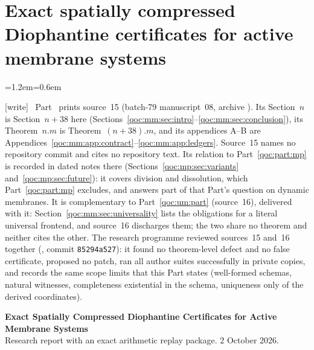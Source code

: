 \documentclass[11pt,letterpaper]{article}
\theoremstyle{definition}
\theoremstyle{remark}
\newcommand{\wtag}{\textup{[write]}}
\newenvironment{writenote}{\par\smallskip\begin{list}{}{\leftmargin=1.2em\rightmargin=0.6em}\item[]\small\wtag\ }{\end{list}\smallskip}
\begin{document}
\clearpage
\part{Exact spatially compressed Diophantine certificates for active membrane systems}\label{qoc:mm:part}

\begin{writenote}
Part~\ref{qoc:mm:part} prints source~15 (batch-79 manuscript~08, archive ). Its Section~$n$ is Section~$n+38$ here (Sections~\ref{qoc:mm:sec:intro}--\ref{qoc:mm:sec:conclusion}), its Theorem~$n.m$ is Theorem~$(n+38).m$, and its appendices A--B are Appendices~\ref{qoc:mm:app:contract}--\ref{qoc:mm:app:ledgers}. Source~15 names no repository commit and cites no repository text. Its relation to Part~\ref{qoc:part:mp} is recorded in dated notes there (Sections~\ref{qoc:mp:sec:variants} and~\ref{qoc:mp:sec:future}): it covers division and dissolution, which Part~\ref{qoc:part:mp} excludes, and answers part of that Part's question on dynamic membranes. It is complementary to Part~\ref{qoc:um:part} (source~16), delivered with it: Section~\ref{qoc:mm:sec:universality} lists the obligations for a literal universal frontend, and source~16 discharges them; the two share no theorem and neither cites the other. The research programme reviewed sources~15 and~16 together (, commit \texttt{85294a527}): it found no theorem-level defect and no false certificate, proposed no patch, ran all author suites successfully in private copies, and records the same scope limits that this Part states (well-formed schemas, natural witnesses, completeness existential in the schema, uniqueness only of the derived coordinates).
\end{writenote}

\begin{center}
{\large\bfseries Exact Spatially Compressed Diophantine Certificates for Active Membrane Systems}\\[3pt]
{\small Research report with an exact arithmetic replay package. 2 October 2026.}
\end{center}
\end{document}
